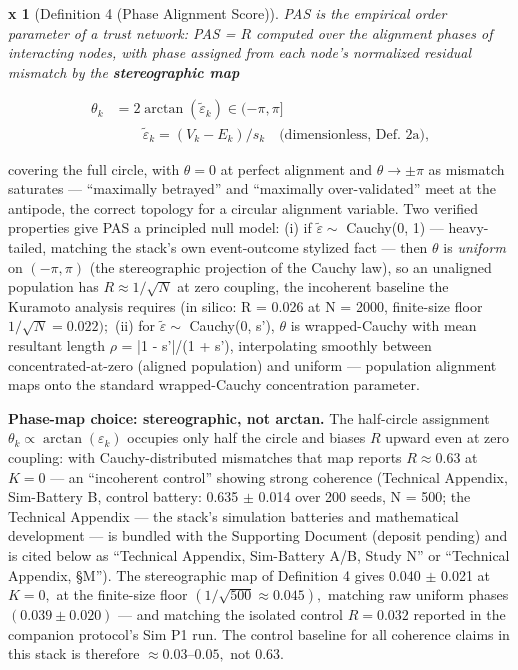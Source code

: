 \documentclass[11pt,twocolumn]{article}
\theoremstyle{gttdef}
\newtheorem*{gttdef}{x}
\theoremstyle{gttplain}
\begin{document}
\begin{gttdef}[{Definition 4 (Phase Alignment Score)}]

PAS is the empirical order parameter of a trust network: PAS = $R$ computed over the alignment phases of interacting nodes, with phase assigned from each node's \emph{normalized} residual mismatch by the \textbf{stereographic map}

\end{gttdef}

\begin{equation}
\begin{split}
\theta_k &= 2 \arctan(\tilde{\varepsilon}_k) \in (-\pi, \pi]\\
&\qquad \tilde{\varepsilon}_k = (V_k - E_k)/s_k \quad \text{(dimensionless, Def.~2a),}
\end{split}
\label{eq:pasmap}
\end{equation}

covering the full circle, with $\theta = 0$ at perfect alignment and $\theta \to \pm \pi$ as mismatch saturates --- ``maximally betrayed'' and ``maximally over-validated'' meet at the antipode, the correct topology for a circular alignment variable. Two verified properties give PAS a principled null model: (i) if $\tilde{\varepsilon} \sim$ Cauchy(0, 1) --- heavy-tailed, matching the stack's own event-outcome stylized fact --- then $\theta$ is \emph{uniform} on $(-\pi, \pi)$ (the stereographic projection of the Cauchy law), so an unaligned population has $R \approx 1/\sqrt{N}$ at zero coupling, the incoherent baseline the Kuramoto analysis requires (in silico: R = 0.026 at N = 2000, finite-size floor $1/\sqrt{N} = 0.022);$ (ii) for $\tilde{\varepsilon} \sim$ Cauchy(0, s'), $\theta$ is wrapped-Cauchy with mean resultant length $\rho$ = |1 - s'|/(1 + s'), interpolating smoothly between concentrated-at-zero (aligned population) and uniform --- population alignment maps onto the standard wrapped-Cauchy concentration parameter.

\textbf{Phase-map choice: stereographic, not arctan.} The half-circle assignment $\theta_k \propto \arctan(\varepsilon_k)$ occupies only half the circle and biases $R$ upward even at zero coupling: with Cauchy-distributed mismatches that map reports $R \approx 0.63$ at $K = 0$ --- an ``incoherent control'' showing strong coherence (Technical Appendix, Sim-Battery B, control battery: 0.635 $\pm$ 0.014 over 200 seeds, N = 500; the Technical Appendix --- the stack's simulation batteries and mathematical development --- is bundled with the Supporting Document (deposit pending) and is cited below as ``Technical Appendix, Sim-Battery A/B, Study N'' or ``Technical Appendix, \S{}M''). The stereographic map of Definition 4 gives 0.040 $\pm$ 0.021 at $K = 0,$ at the finite-size floor $(1/\sqrt{500} \approx 0.045),$ matching raw uniform phases $(0.039 \pm 0.020)$ --- and matching the isolated control $R = 0.032$ reported in the companion protocol's Sim P1 run. The control baseline for all coherence claims in this stack is therefore $\approx 0.03$--$0.05,$ not 0.63.
\end{document}
